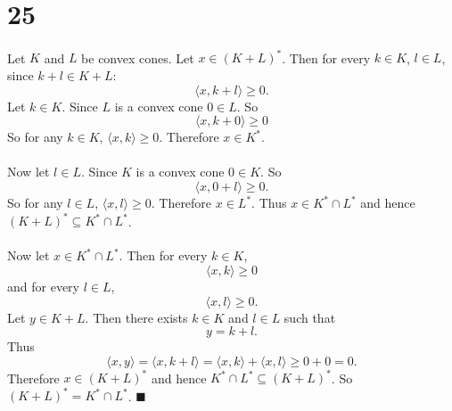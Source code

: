 \documentclass[letterpaper,12pt,oneside,onecolumn]{article}
\begin{document}
\section*{25}
\paragraph{}
Let $K$ and $L$ be convex cones. Let $x \in (K+L)^*$. Then for every $k \in K$, $l \in L$, since $k+l \in K+L$:
$$\langle x,k+l \rangle \geq 0.$$
Let $k \in K$. Since $L$ is a convex cone $0 \in L$. So $$\langle x, k+0 \rangle \geq 0$$
So for any $k \in K$, $\langle x, k \rangle \geq 0$. Therefore $x \in K^*$.
\paragraph{}
Now let $l \in L$. Since $K$ is a convex cone $0 \in K$. So $$\langle x, 0+l \rangle \geq 0.$$
So for any $l \in L$, $\langle x, l \rangle \geq 0$. Therefore $x \in L^*$. Thus $x \in K^* \cap L^*$ and hence $(K+L)^* \subseteq K^* \cap L^*$.
\paragraph{}
Now let $x \in K^* \cap L^*$. Then for every $k \in K$, $$\langle x, k \rangle \geq 0$$ and for every $l \in L$, $$\langle x, l \rangle \geq 0.$$
Let $y \in K+L$. Then there exists $k \in K$ and $l \in L$ such that $$y=k+l.$$ Thus
$$\langle x, y \rangle = \langle x, k+l \rangle = \langle x, k\rangle +\langle x, l \rangle \geq 0 + 0 = 0.$$
Therefore $x \in (K+L)^*$ and hence $K^* \cap L^* \subseteq (K+L)^*$. So $(K+L)^*= K^* \cap L^*$. $\blacksquare$
\end{document}
